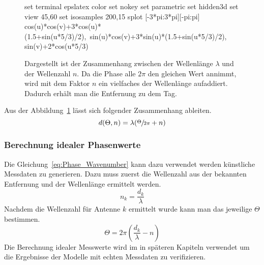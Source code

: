 \begin{figure}[h!]
	\caption[Zusammenhang Wellenlänge - Wellenzahl]{Dargestellt ist der Zusammenhang zwischen der Wellenlänge $\lambda$ und der Wellenzahl $n$. Da die Phase alle $2\pi$ den gleichen Wert annimmt, wird mit dem Faktor $n$ ein vielfaches der Wellenlänge aufaddiert. Dadurch erhält man die Entfernung zu dem Tag.}
	\label{fig:wavenumber_wavelength}
	\begin{gnuplot} %
		set terminal epslatex color %
		set nokey %
		set parametric
		set hidden3d
		set view 45,60
		set isosamples 200,15
		splot [-3*pi:3*pi][-pi:pi] cos(u)*cos(v)+3*cos(u)*(1.5+sin(u*5/3)/2),\
		sin(u)*cos(v)+3*sin(u)*(1.5+sin(u*5/3)/2), sin(v)+2*cos(u*5/3)
	\end{gnuplot}	
%	
%	
\end{figure}


Aus der Abbildung~\ref{fig:wavenumber_wavelength} lässt sich folgender Zusammenhang ableiten.
%
\begin{equation}
\label{eq:Phase_Wavenumber}
	d(\Theta, n)=\lambda(\sfrac{\Theta}{2\pi}+n)
\end{equation}
%
\subsubsection{Berechnung idealer Phasenwerte}
\label{sec:PhaseCalculation}
%
Die Gleichung~\ref{eq:Phase_Wavenumber} kann dazu verwendet werden künstliche Messdaten zu generieren. Dazu muss zuerst die Wellenzahl aus der bekannten Entfernung und der Wellenlänge ermittelt werden.
$$
n_k=\frac{d_k}{\lambda}
$$
Nachdem die Wellenzahl für Antenne $k$ ermittelt wurde kann man das jeweilige $\Theta$ bestimmen.
$$
\Theta= 2\pi(\frac{d_k }{\lambda}-n)
$$
%
Die Berechnung idealer Messwerte wird im in späteren Kapiteln verwendet um die Ergebnisse der Modelle mit echten Messdaten zu verifizieren.